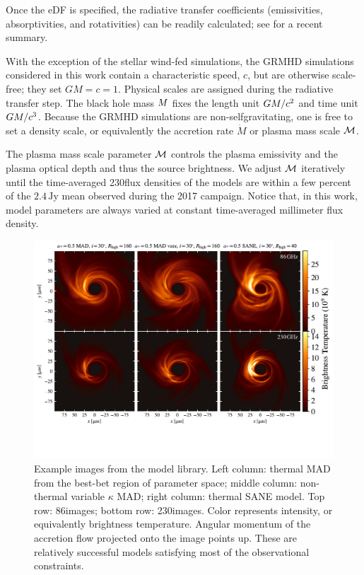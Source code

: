 Once the eDF is specified, the radiative transfer coefficients (emissivities, absorptivities, and rotativities) can be readily calculated; see \cite{2021ApJ...921...17M} for a recent summary.


With the exception of the stellar wind-fed simulations, the GRMHD simulations considered in this work contain a characteristic speed, $c$, but are otherwise scale-free; they set $GM = c = 1$.
Physical scales are assigned during the radiative transfer step.
The black hole mass $M$ fixes the length unit $GM/c^2$ and time unit $GM/c^3$.
Because the GRMHD simulations are non-selfgravitating, one is free to set a density scale, or equivalently the accretion rate $\dot{M}$ or plasma mass scale $\mathcal{M}$.

The plasma mass scale parameter $\mathcal{M}$ controls the plasma emissivity and the plasma optical depth and thus the source brightness.
We adjust $\mathcal{M}$ iteratively until the time-averaged 230\GHz flux densities of the models are within a few percent of the $2.4\,\mathrm{Jy}$ mean observed during the 2017 campaign.
Notice that, in this work, model parameters are always varied at constant time-averaged millimeter flux density.


\begin{figure}
  \centering
  \includegraphics[width=\textwidth]{figures/example_imgs.pdf}
  \caption{Example images from the model library.
    Left column: thermal MAD from the best-bet region of parameter space; middle column: non-thermal variable $\kappa$ MAD; right column: thermal SANE model.
    Top row: 86\GHz images; bottom row: 230\GHz images.
    Color represents intensity, or equivalently brightness temperature.
    Angular momentum of the accretion flow projected onto the image points up.
    These are relatively successful models satisfying most of the observational  constraints.}
  \label{fig:example_imgs}
\end{figure}

